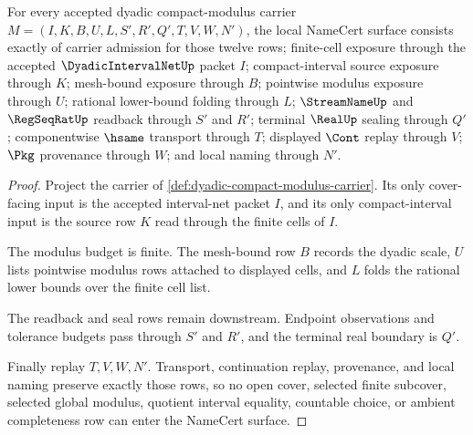 \begin{theorem}
\label{thm:dyadic-compact-modulus-namecert-obligations}
For every accepted dyadic compact-modulus carrier $M=(I,K,B,U,L,S',R',Q',T,V,W,N')$, the local NameCert surface consists exactly of carrier admission for those twelve rows; finite-cell exposure through the accepted $\DyadicIntervalNetUp$ packet $I$; compact-interval source exposure through $K$; mesh-bound exposure through $B$; pointwise modulus exposure through $U$; rational lower-bound folding through $L$; $\StreamNameUp$ and $\RegSeqRatUp$ readback through $S'$ and $R'$; terminal $\RealUp$ sealing through $Q'$; componentwise $\hsame$ transport through $T$; displayed $\Cont$ replay through $V$; $\Pkg$ provenance through $W$; and local naming through $N'$.
\end{theorem}
\begin{proof}
Project the carrier of \autoref{def:dyadic-compact-modulus-carrier}. Its only cover-facing input is the accepted interval-net packet $I$, and its only compact-interval input is the source row $K$ read through the finite cells of $I$.

The modulus budget is finite. The mesh-bound row $B$ records the dyadic scale, $U$ lists pointwise modulus rows attached to displayed cells, and $L$ folds the rational lower bounds over the finite cell list.

The readback and seal rows remain downstream. Endpoint observations and tolerance budgets pass through $S'$ and $R'$, and the terminal real boundary is $Q'$.

Finally replay $T,V,W,N'$. Transport, continuation replay, provenance, and local naming preserve exactly those rows, so no open cover, selected finite subcover, selected global modulus, quotient interval equality, countable choice, or ambient completeness row can enter the NameCert surface.
\end{proof}

